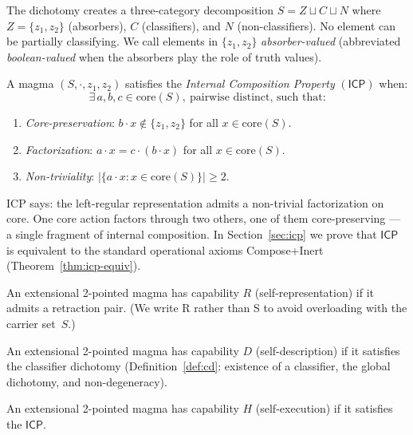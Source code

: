 \documentclass[sigconf,screen]{acmart}
\newcommand{\dotop}{\cdot}
\newcommand{\ICP}{\textsf{ICP}}
\newcommand{\core}{\mathrm{core}}
\theoremstyle{remark}
\begin{document}
The dichotomy creates a three-category decomposition $S = Z \sqcup C \sqcup N$ where $Z = \{z_1, z_2\}$ (absorbers), $C$ (classifiers), and $N$ (non-classifiers). No element can be partially classifying. We call elements in $\{z_1, z_2\}$ \emph{absorber-valued} (abbreviated \emph{boolean-valued} when the absorbers play the role of truth values).

\begin{definition}
\label{def:icp}
A magma $(S, \dotop, z_1, z_2)$ satisfies the \emph{Internal Composition Property} $(\ICP)$ when:
\[
\exists\, a, b, c \in \core(S),\ \text{pairwise distinct, such that:}
\]
\begin{enumerate}
  \item \emph{Core-preservation}: $b \dotop x \notin \{z_1, z_2\}$ for all $x \in \core(S)$.
  \item \emph{Factorization}: $a \dotop x = c \dotop (b \dotop x)$ for all $x \in \core(S)$.
  \item \emph{Non-triviality}: $|\{a \dotop x : x \in \core(S)\}| \geq 2$.
\end{enumerate}
\end{definition}

ICP says: the left-regular representation admits a non-trivial factorization on core. One core action factors through two others, one of them core-preserving --- a single fragment of internal composition. In Section~\ref{sec:icp} we prove that $\ICP$ is equivalent to the standard operational axioms Compose+Inert (Theorem~\ref{thm:icp-equiv}).

\begin{definition}[Capability R]
An extensional 2-pointed magma has capability $R$ (self-representation) if it admits a retraction pair. (We write R rather than S to avoid overloading with the carrier set~$S$.)
\end{definition}

\begin{definition}[Capability D]
An extensional 2-pointed magma has capability $D$ (self-description) if it satisfies the classifier dichotomy (Definition~\ref{def:cd}: existence of a classifier, the global dichotomy, and non-degeneracy).
\end{definition}

\begin{definition}[Capability H]
An extensional 2-pointed magma has capability $H$ (self-execution) if it satisfies the $\ICP$.
\end{definition}
\end{document}
